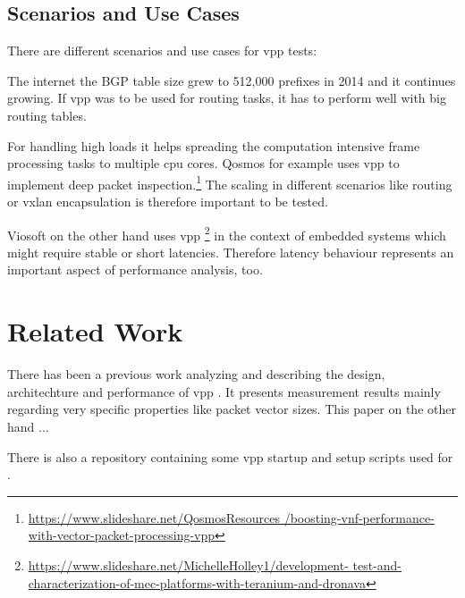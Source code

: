 \subsection{Scenarios and Use Cases}



There are different scenarios and use cases for \Ac{vpp} tests: 

The internet the BGP table size grew to 512,000 prefixes in 2014 and
it continues growing. If \Ac{vpp} was to be used for routing tasks, it
has to perform well with big routing tables.

For handling high loads it helps spreading the computation intensive
frame processing tasks to multiple cpu cores. Qosmos for example uses
\Ac{vpp} to implement deep packet
inspection.\footnote{\url{https://www.slideshare.net/QosmosResources
/boosting-vnf-performance-with-vector-packet-processing-vpp}} The
scaling in different scenarios like routing or vxlan encapsulation is
therefore important to be tested.

Viosoft on the other hand uses \Ac{vpp}
\footnote{\url{https://www.slideshare.net/MichelleHolley1/development-
test-and-characterization-of-mec-platforms-with-teranium-and-dronava}}
in the context of embedded systems which might require stable or short
latencies. Therefore latency behaviour represents an important aspect
of performance analysis, too.


\section{Related Work}

There has been a previous work analyzing and describing the design,
architechture and performance of \Ac{vpp} \cite{linguaglossa2017high}.
It presents measurement results mainly regarding very specific
properties like packet vector sizes. This paper on the other hand ...


There is also a repository \cite{github:vpp-bench} containing some
\Ac{vpp} startup and setup scripts used for
\cite{linguaglossa2017high}.

